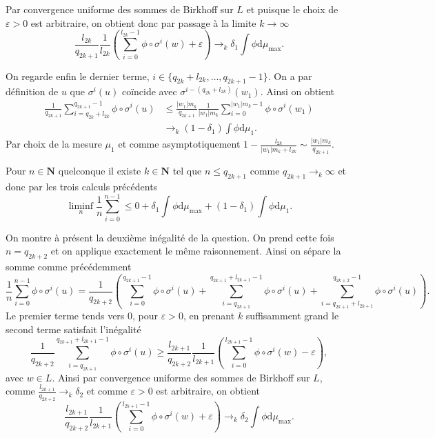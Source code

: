 \documentclass[12pt]{article}
\newcommand{\N}{\mathbf{N}}
\newcommand{\de}{\mathrm{d}}
\begin{document}
Par convergence uniforme des sommes de Birkhoff sur $L$ et puisque le choix de $\varepsilon > 0$ est arbitraire, on obtient donc par passage à la limite $k \to \infty$ \[
\frac{l_{2k}}{q_{2k+1}}\frac{1}{l_{2k}}(\sum_{i=0}^{l_{2k}-1} \phi\circ\sigma^{i}(w) + \varepsilon) \to_{k} \delta_{1}\int\phi\de\mu_{\max} 
.\] 

On regarde enfin le dernier terme, $i \in \{q_{2k}+l_{2k}, \ldots, q_{2k+1}-1\}$. On a par définition de $u$ que $\sigma^{i}(u)$ coïncide avec $\sigma^{i-(q_{2k}+l_{2k})}(w_1)$. Ainsi on obtient
\begin{align*}
        \frac{1}{q_{2k+1}}\sum_{i=q_{2k}+l_{2k}}^{q_{2k+1}-1} \phi\circ\sigma^{i}(u) &\le \frac{|w_{1}|m_{k}}{q_{2k+1}}\frac{1}{|w_{1}|m_{k}}\sum_{i=0}^{|w_{1}|m_{k}-1} \phi\circ\sigma^{i}(w_{1}) \\
                                                                                     &\to_{k}(1-\delta_{1})\int\phi\de\mu_{1}
.\end{align*}
Par choix de la mesure $\mu_{1}$ et comme asymptotiquement $1-\frac{l_{2k}}{|w_{1}|m_{k}+l_{2k}} \sim \frac{|w_{1}|m_{k}}{q_{2k+1}}$.

\medskip

Pour $n \in \N$ quelconque il existe $k \in \N$ tel que $n \le q_{2k+1}$ comme $q_{2k+1}\to_{k} \infty$ et donc par les trois calculs précédents \[
        \liminf_{n}\frac{1}{n}\sum_{i=0}^{n-1} \le 0 + \delta_{1}\int\phi\de\mu_{\max} + (1-\delta_{1})\int\phi\de\mu_{1}
.\]  

\medskip

On montre à présent la deuxième inégalité de la question. On prend cette fois $n = q_{2k+2}$ et on applique exactement le même raisonnement.
Ainsi on sépare la somme comme précédemment \[
        \frac{1}{n}\sum_{i=0}^{n-1} \phi\circ\sigma^{i}(u) = \frac{1}{q_{2k+2}}(\sum_{i=0}^{q_{2k+1}-1} \phi\circ\sigma^{i}(u) + \sum_{i=q_{2k+1}}^{q_{2k+1}+l_{2k+1}-1} \phi\circ\sigma^{i}(u) + \sum_{i=q_{2k+1}+l_{2k+1}}^{q_{2k+2}-1} \phi\circ\sigma^{i}(u))
.\] 
Le premier terme tends vers 0, pour $\varepsilon > 0$, en prenant $k$ suffisamment grand le second terme satisfait l'inégalité \[
        \frac{1}{q_{2k+2}}\sum_{i=q_{2k+1}}^{q_{2k+1}+l_{2k+1}-1} \phi\circ\sigma^{i}(u) \ge \frac{l_{2k+1}}{q_{2k+2}}\frac{1}{l_{2k+1}}(\sum_{i=0}^{l_{2k+1}-1} \phi\circ\sigma^{i}(w) - \varepsilon) 
,\] avec $w \in L$. Ainsi par convergence uniforme des sommes de Birkhoff sur $L$, comme $\frac{l_{2k+1}}{q_{2k+2}}\to_{k}\delta_{2}$ et comme $\varepsilon > 0$ est arbitraire, on obtient  \[
\frac{l_{2k+1}}{q_{2k+2}}\frac{1}{l_{2k+1}}(\sum_{i=0}^{l_{2k+1}-1} \phi\circ\sigma^{i}(w) + \varepsilon) \to_{k} \delta_{2}\int\phi\de\mu_{\max} 
.\] 
\end{document}
